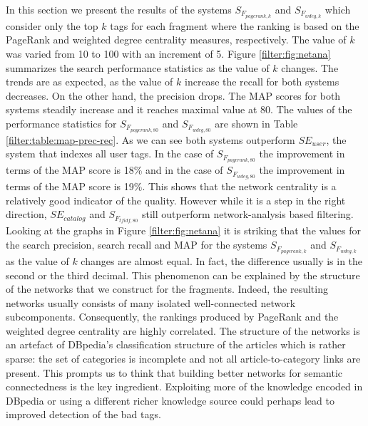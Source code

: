 In this section we present the results of the systems $S_{F_{pagerank,k}}$ and $S_{F_{wdeg,k}}$ which consider only the top $k$ tags for each fragment where the ranking is based on the PageRank and weighted degree centrality measures, respectively. The value of $k$ was varied from 10 to 100 with an increment of 5. Figure \ref{filter:fig:netana} summarizes the search performance statistics as the value of $k$ changes. The trends are as expected, as the value of $k$ increase the recall for both systems decreases. On the other hand, the precision drops. The MAP scores for both systems steadily increase and it reaches maximal value at 80. The values of the performance statistics for $S_{F_{pagerank,80}}$ and $S_{F_{wdeg,80}}$ are shown in Table \ref{filter:table:map-prec-rec}. As we can see both systems outperform $SE_{user}$, the system that indexes all user tags. In the case of $S_{F_{pagerank,80}}$ the improvement in terms of the MAP score is 18\% and in the case of $S_{F_{wdeg,80}}$ the improvement in terms of the MAP score is 19\%. This shows that the network centrality is a relatively good indicator of the quality. However while it is a step in the right direction, $SE_{catalog}$ and $S_{F_{tfidf,80}}$ still outperform network-analysis based filtering. Looking at the graphs in Figure \ref{filter:fig:netana} it is striking that the values for the search precision, search recall and MAP for the systems $S_{F_{pagerank,k}}$ and $S_{F_{wdeg,k}}$ as the value of $k$ changes are almost equal. In fact, the difference usually is in the second or the third decimal. This phenomenon can be explained by the structure of the networks that we construct for the fragments. Indeed, the resulting networks usually consists of many isolated well-connected network subcomponents. Consequently, the rankings produced by PageRank and the weighted degree centrality are highly correlated. The structure of the networks is an artefact of DBpedia's classification structure of the articles which is rather sparse: the set of categories is incomplete and not all article-to-category links are present. This prompts us to think that building better networks for semantic connectedness is the key ingredient. Exploiting more of the knowledge encoded in DBpedia or using a different richer knowledge source could perhaps lead to improved detection of the bad tags. 

